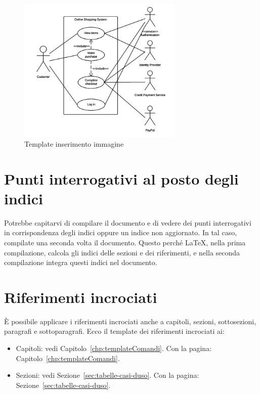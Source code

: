 \begin{figure}
	\centering
	\includegraphics[width=0.7\textwidth]{imgs/file-comuni-ai-gruppi/useCaseEsempio.png}
	\caption{Template inserimento immagine}
	\label{fig:template-inserimento-immagine}
\end{figure}

\section{Punti interrogativi al posto degli indici}

Potrebbe capitarvi di compilare il documento e di vedere dei punti interrogativi in corrispondenza degli indici oppure un indice non aggiornato. In tal caso, compilate una seconda volta il documento. Questo perché \LaTeX , nella prima compilazione, calcola gli indici delle sezioni e dei riferimenti, e nella seconda compilazione integra questi indici nel documento.

\section{Riferimenti incrociati}

È possibile applicare i riferimenti incrociati anche a capitoli, sezioni, sottosezioni, paragrafi e sottoparagrafi. Ecco il template dei riferimenti incrociati ai:

\begin{itemize}
\item
Capitoli: vedi Capitolo~\ref{chp:templateComandi}. Con la pagina: Capitolo~\vref{chp:templateComandi}.
\item
Sezioni: vedi Sezione~\ref{sec:tabelle-casi-duso}. Con la pagina: Sezione~\vref{sec:tabelle-casi-duso}.
\end{itemize}

\clearpage